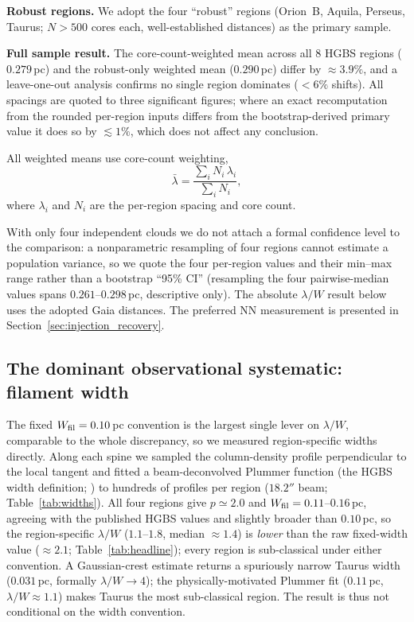 \documentclass[usenatbib,twoside,twocolumn]{mnras}
\begin{document}
\textbf{Robust regions.} We adopt the four ``robust'' regions (Orion~B, Aquila, Perseus, Taurus; $N>500$ cores each, well-established distances) as the primary sample.

\textbf{Full sample result.} The core-count-weighted mean across all 8 HGBS regions ($0.279$\,pc) and the robust-only weighted mean ($0.290$\,pc) differ by $\approx3.9\%$, and a leave-one-out analysis confirms no single region dominates ($<6\%$ shifts). All spacings are quoted to three significant figures; where an exact recomputation from the rounded per-region inputs differs from the bootstrap-derived primary value it does so by $\lesssim1\%$, which does not affect any conclusion.

All weighted means use core-count weighting,
\begin{equation}
\bar{\lambda} = \frac{\sum_i N_i\,\lambda_i}{\sum_i N_i},
\label{eq:weighting}
\end{equation}
where $\lambda_i$ and $N_i$ are the per-region spacing and core count.

With only four independent clouds we do not attach a formal confidence level to the comparison: a nonparametric resampling of four regions cannot estimate a population variance, so we quote the four per-region values and their min--max range rather than a bootstrap ``95\% CI'' (resampling the four pairwise-median values spans $0.261$--$0.298$\,pc, descriptive only). The absolute $\lambda/W$ result below uses the adopted Gaia distances. The preferred NN measurement is presented in Section~\ref{sec:injection_recovery}.

\subsection{The dominant observational systematic: filament width}
\label{sec:widths}

The fixed $W_{\rm fil}=0.10$\,pc convention is the largest single lever on $\lambda/W$, comparable to the whole discrepancy, so we measured region-specific widths directly. Along each spine we sampled the column-density profile perpendicular to the local tangent and fitted a beam-deconvolved Plummer function (the HGBS width definition; \citealt{Arzoumanian2019}) to hundreds of profiles per region ($18.2''$ beam; Table~\ref{tab:widths}). All four regions give $p\simeq2.0$ and $W_{\rm fil}=0.11$--$0.16$\,pc, agreeing with the published HGBS values and slightly broader than $0.10$\,pc, so the region-specific $\lambda/W$ ($1.1$--$1.8$, median $\approx1.4$) is \emph{lower} than the raw fixed-width value ($\approx2.1$; Table~\ref{tab:headline}); every region is sub-classical under either convention. A Gaussian-crest estimate returns a spuriously narrow Taurus width ($0.031$\,pc, formally $\lambda/W\to4$); the physically-motivated Plummer fit ($0.11$\,pc, $\lambda/W\approx1.1$) makes Taurus the most sub-classical region. The result is thus not conditional on the width convention.
\end{document}
